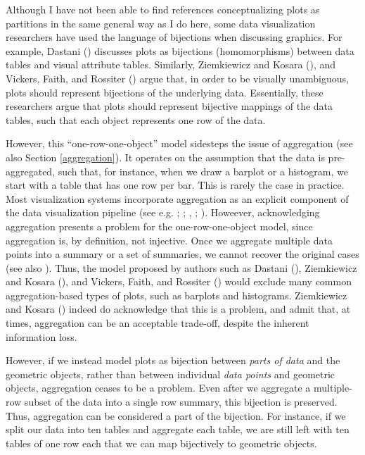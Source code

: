 \documentclass[
]{book}
\theoremstyle{definition}
\theoremstyle{definition}
\theoremstyle{definition}
\theoremstyle{definition}
\theoremstyle{remark}
\begin{document}
Although I have not been able to find references conceptualizing plots as partitions in the same general way as I do here, some data visualization researchers have used the language of bijections when discussing graphics. For example, Dastani () discusses plots as bijections (homomorphisms) between data tables and visual attribute tables. Similarly, Ziemkiewicz and Kosara (), and Vickers, Faith, and Rossiter () argue that, in order to be visually unambiguous, plots should represent bijections of the underlying data. Essentially, these researchers argue that plots should represent bijective mappings of the data tables, such that each object represents one row of the data.

However, this ``one-row-one-object'' model sidesteps the issue of aggregation (see also Section \ref{aggregation}). It operates on the assumption that the data is pre-aggregated, such that, for instance, when we draw a barplot or a histogram, we start with a table that has one row per bar. This is rarely the case in practice. Most visualization systems incorporate aggregation as an explicit component of the data visualization pipeline (see e.g. ; ; , ; ). Howeever, acknowledging aggregation presents a problem for the one-row-one-object model, since aggregation is, by definition, not injective. Once we aggregate multiple data points into a summary or a set of summaries, we cannot recover the original cases (see also ). Thus, the model proposed by authors such as Dastani (), Ziemkiewicz and Kosara (), and Vickers, Faith, and Rossiter () would exclude many common aggregation-based types of plots, such as barplots and histograms. Ziemkiewicz and Kosara () indeed do acknowledge that this is a problem, and admit that, at times, aggregation can be an acceptable trade-off, despite the inherent information loss.

However, if we instead model plots as bijection between \emph{parts of data} and the geometric objects, rather than between individual \emph{data points} and geometric objects, aggregation ceases to be a problem. Even after we aggregate a multiple-row subset of the data into a single row summary, this bijection is preserved. Thus, aggregation can be considered a part of the bijection. For instance, if we split our data into ten tables and aggregate each table, we are still left with ten tables of one row each that we can map bijectively to geometric objects.
\end{document}
